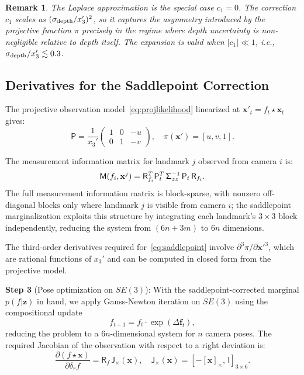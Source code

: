 \documentclass[journal]{IEEEtran}
\newcommand{\sfSigma}[1]{\mathsf{\Sigma}_\mathnormal{#1}}
\newcommand{\beq}{\begin{equation}}
\newcommand{\eeq}{\end{equation}}
\newtheorem{remark}{Remark}
\begin{document}
\begin{remark}
The Laplace approximation is the special case $c_1 = 0$. 
The correction $c_1$ scales as 
$(\sigma_{\rm depth}/x_3')^2$, so it captures the 
asymmetry introduced by the projective function $\pi$ 
precisely in the regime where depth uncertainty is 
non-negligible relative to depth itself.
The expansion is valid when $|c_1| \ll 1$, 
i.e., $\sigma_{\rm depth}/x_3' \lesssim 0.3$.
\end{remark}

\subsection{Derivatives for the Saddlepoint Correction}

The projective observation model~\eqref{eq:projlikelihood} 
linearized at $\mathbf{x}'_t = f_t \star \mathbf{x}_t$ gives:
\beq
    \mathsf{P} = \frac{1}{x_3'}\begin{pmatrix}
    1 & 0 & -u \\ 0 & 1 & -v
    \end{pmatrix},\quad
    \pi(\mathbf{x}') = [u, v, 1].
    \label{eq:projjacobian}
\eeq

The measurement information matrix 
for landmark $j$ observed from camera $i$ is:
\beq
    \mathsf{M}(f_i, \mathbf{x}^j) = 
    \mathsf{R}_{f_i}^T \mathsf{P}_t^T\, 
    \sfSigma{zz}^{-1}\, \mathsf{P}_t\, \mathsf{R}_{f_i}.
    \label{eq:Mmatrix}
\eeq
The full measurement information matrix is block-sparse, with nonzero off-diagonal blocks only where landmark $j$ is visible from camera $i$; the saddlepoint marginalization exploits this structure by integrating each landmark's $3\times 3$ block independently, reducing the system from $(6n+3m)$ to $6n$ dimensions.

The third-order derivatives required for~\eqref{eq:saddlepoint} 
involve $\partial^3 \pi / \partial \mathbf{x}'^3$, which 
are rational functions of $x_3'$ and can be computed in 
closed form from the projective model.

\textbf{Step 3} (Pose optimization on $SE(3)$): 
With the saddlepoint-corrected marginal 
$p(f | \mathbf{z})$ in hand, we apply Gauss-Newton 
iteration on $SE(3)$ using the compositional update
\beq
    f_{t+1} = f_t \cdot \exp(\Delta \mathbf{f}_t),
    \label{eq:poseupdate}
\eeq
reducing the problem to a $6n$-dimensional system 
for $n$ camera poses. The required Jacobian of the 
observation with respect to a right deviation is:
\beq
    \frac{\partial(f \star \mathbf{x})}{\partial \delta_r f} = 
    \mathsf{R}_f\, \mathsf{J}_\times(\mathbf{x}),\quad
    \mathsf{J}_\times(\mathbf{x}) = 
    [-[\mathbf{x}]_\times,\, \mathsf{I}]_{3 \times 6}.
    \label{eq:posejacobian}
\eeq
\end{document}
